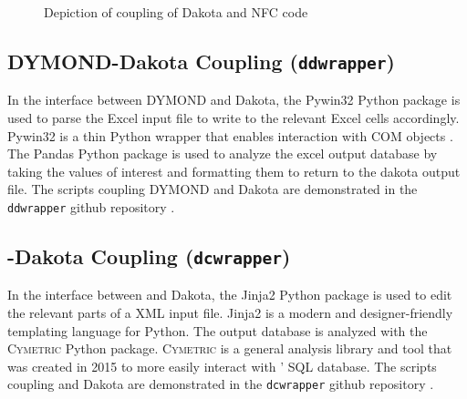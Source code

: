 \begin{figure}[]
    \centering
    \caption{Depiction of coupling of Dakota and NFC code}
    \label{fig:dakota-NFC-flow}
\end{figure}

\subsection{DYMOND-Dakota Coupling (\texttt{ddwrapper})}
In the interface between DYMOND and Dakota, the Pywin32 
\cite{hammond_python_2000}
Python package is used to parse the Excel input file to 
write to the relevant Excel cells accordingly. 
Pywin32 is a thin Python wrapper that enables interaction 
with COM objects \cite{hammond_python_2000}. 
The Pandas \cite{mckinney_pandas:_2011} Python
package is used to analyze the excel output database 
by taking the values of interest and formatting them 
to return to the dakota output file.
The scripts coupling DYMOND and Dakota are demonstrated in the 
\texttt{ddwrapper} github repository \cite{chee_gwenchee/ddwrapper_2019}.

\subsection{\Cyclus-Dakota Coupling (\texttt{dcwrapper})}
In the interface between \Cyclus and Dakota, 
the Jinja2 \cite{ronacher_welcome_2018} Python package is used 
to edit the relevant parts of a \Cyclus XML input file. 
Jinja2 is a modern and designer-friendly templating 
language for Python. 
The \Cyclus output database is analyzed with
the \textsc{Cymetric} Python \cite{scopatz_cymetric_2015} package. 
\textsc{Cymetric} is a general analysis library and tool that was 
created in 2015 to more easily interact with \Cyclus' SQL 
database. 
The scripts coupling \Cyclus and Dakota are demonstrated in the 
\texttt{dcwrapper} github repository \cite{chee_arfc/dcwrapper_2019}.



